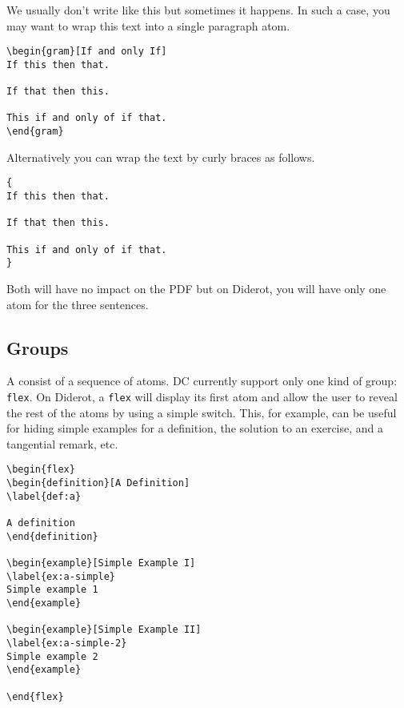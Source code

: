 We usually don't write like this but sometimes it happens.
%
In such a case, you may want to wrap this text into a single paragraph atom.
%
\begin{lstlisting}
\begin{gram}[If and only If]
If this then that.

If that then this.

This if and only of if that.
\end{gram}
\end{lstlisting}
%
Alternatively you can wrap the text by curly braces as follows.
%
\begin{lstlisting}
{
If this then that.

If that then this.

This if and only of if that.
}
\end{lstlisting}
%
%
Both will have no impact on the PDF but on Diderot, you will have only one atom for the three sentences.

\subsection{Groups}
\label{sec:mtl::groups}

\begin{definition}[Group]
A  consist of a sequence of atoms.  DC currently support only one kind of group: \lstinline`flex`.  On Diderot, a \lstinline`flex` will display its first atom and allow the user to reveal the rest of the atoms by using a simple switch.  This, for example, can be useful for hiding simple examples for a definition, the solution to an exercise, and a tangential remark, etc. 

\begin{lstlisting}
\begin{flex}
\begin{definition}[A Definition]
\label{def:a}

A definition
\end{definition}

\begin{example}[Simple Example I]
\label{ex:a-simple}
Simple example 1
\end{example}

\begin{example}[Simple Example II]
\label{ex:a-simple-2}
Simple example 2
\end{example}

\end{flex}
\end{lstlisting}
\end{definition}

